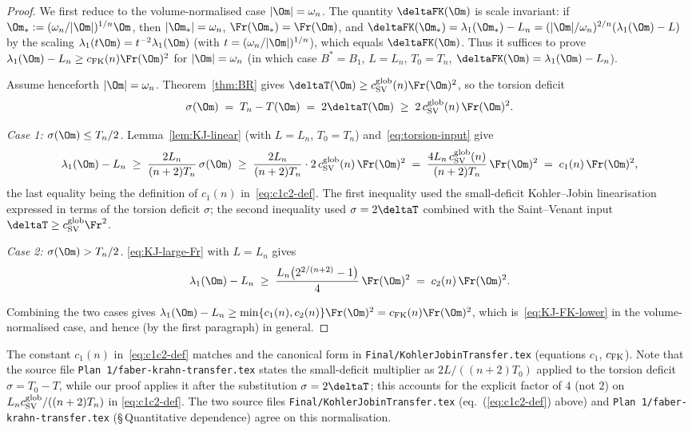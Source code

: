 \begin{proof}
We first reduce to the volume-normalised case $|\Om|=\omega_n$. The
quantity $\deltaFK(\Om)$ is scale invariant: if
$\Om_*:=(\omega_n/|\Om|)^{1/n}\Om$, then $|\Om_*|=\omega_n$,
$\Fr(\Om_*)=\Fr(\Om)$, and
$\deltaFK(\Om_*)=\lambda_1(\Om_*)-L_n=
(|\Om|/\omega_n)^{2/n}(\lambda_1(\Om)-L)$ by the scaling
$\lambda_1(t\Om)=t^{-2}\lambda_1(\Om)$ (with $t=(\omega_n/|\Om|)^{1/n}$),
which equals $\deltaFK(\Om)$.
Thus it suffices to prove
$\lambda_1(\Om)-L_n\ge c_{\rm FK}(n)\Fr(\Om)^2$ for
$|\Om|=\omega_n$ (in which case $B^*=B_1$, $L=L_n$, $T_0=T_n$,
$\deltaFK(\Om)=\lambda_1(\Om)-L_n$).

Assume henceforth $|\Om|=\omega_n$. Theorem~\ref{thm:BR} gives
$\deltaT(\Om)\ge c_{\rm SV}^{\rm glob}(n)\Fr(\Om)^2$, so the torsion
deficit
\begin{equation}\label{eq:torsion-input}
\sigma(\Om) \;=\; T_n - T(\Om) \;=\; 2\deltaT(\Om)
\;\ge\; 2\,c_{\rm SV}^{\rm glob}(n)\,\Fr(\Om)^2.
\end{equation}

\emph{Case 1: $\sigma(\Om)\le T_n/2$.}
Lemma~\ref{lem:KJ-linear} (with $L=L_n$, $T_0=T_n$)
and~\eqref{eq:torsion-input} give
\[
\lambda_1(\Om) - L_n
\;\ge\;
\frac{2 L_n}{(n+2) T_n}\,\sigma(\Om)
\;\ge\;
\frac{2 L_n}{(n+2) T_n}\cdot 2\,c_{\rm SV}^{\rm glob}(n)\,\Fr(\Om)^2
\;=\;
\frac{4 L_n\,c_{\rm SV}^{\rm glob}(n)}{(n+2) T_n}\,\Fr(\Om)^2
\;=\;
c_1(n)\,\Fr(\Om)^2,
\]
the last equality being the definition of $c_1(n)$
in~\eqref{eq:c1c2-def}. The first inequality used the small-deficit
Kohler--Jobin linearisation expressed in terms of the torsion deficit
$\sigma$; the second inequality used $\sigma=2\deltaT$ combined with
the Saint--Venant input
$\deltaT\ge c_{\rm SV}^{\rm glob}\Fr^2$.

\emph{Case 2: $\sigma(\Om)>T_n/2$.}
\eqref{eq:KJ-large-Fr} with $L=L_n$ gives
\[
\lambda_1(\Om)-L_n
\;\ge\; \frac{L_n\bigl(2^{2/(n+2)}-1\bigr)}{4}\,\Fr(\Om)^2
\;=\; c_2(n)\,\Fr(\Om)^2.
\]

Combining the two cases gives
$\lambda_1(\Om)-L_n\ge\min\{c_1(n),c_2(n)\}\Fr(\Om)^2
=c_{\rm FK}(n)\Fr(\Om)^2$, which is~\eqref{eq:KJ-FK-lower} in the
volume-normalised case, and hence (by the first paragraph) in general.
\end{proof}

\begin{remark}\label{rem:factor-two}
The constant $c_1(n)$ in~\eqref{eq:c1c2-def} matches
\cite[\S3, eq.~(3.1)]{Brasco2014} and the canonical form in
\texttt{Final/KohlerJobinTransfer.tex} (equations $c_1$, $c_{\rm FK}$).
Note that the source file
\texttt{Plan~1/faber-krahn-transfer.tex} states the small-deficit
multiplier as $2L/((n+2)T_0)$ applied to the torsion deficit
$\sigma=T_0-T$, while our proof applies it after the substitution
$\sigma=2\deltaT$; this accounts for the explicit factor of $4$ (not
$2$) on $L_n c_{\rm SV}^{\rm glob}/((n+2)T_n)$ in
\eqref{eq:c1c2-def}. The two source files
\texttt{Final/KohlerJobinTransfer.tex} (eq.~(\ref{eq:c1c2-def}) above)
and \texttt{Plan~1/faber-krahn-transfer.tex} (\S\,Quantitative
dependence) agree on this normalisation.
\end{remark}

